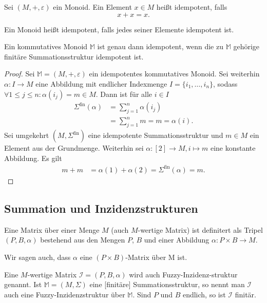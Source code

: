 \documentclass{article}
\begin{document}
\begin{definition}
  Sei $(M, +, \varepsilon)$ ein Monoid. 
  Ein Element $x \in M$ heißt idempotent, falls
  \begin{equation*}
    x + x = x.
  \end{equation*}
  
  Ein Monoid heißt idempotent, falls jedes seiner Elemente idempotent ist.
\end{definition}

\begin{theorem}\label{Theorem_IdempotentSumMonoid}
  Ein kommutatives Monoid $\mathbb{M}$ ist genau dann idempotent, 
  wenn die zu $\mathbb{M}$ gehörige finitäre Summationsstruktur idempotent ist.
\end{theorem}
\begin{proof}
  Sei $\mathbb{M} = (M, +, \varepsilon)$ ein idempotentes kommutatives Monoid.
  Sei weiterhin $\alpha \colon I \to M$ eine Abbildung mit endlicher Indexmenge $I = \{i_1, \dots, i_n\}$,
  sodass $\forall 1 \leq j \leq n \colon \alpha(i_j) = m \in M$.
  Dann ist für alle $i \in I$
  \begin{align*}
    \Sigma^\text{fin}(\alpha) &= \sum_{j = 1}^n\alpha(i_j) \\
    &= \sum_{j = 1}^n m = m = \alpha(i).
  \end{align*}
  Sei umgekehrt $(M, \Sigma^\text{fin})$ eine idempotente Summationsstruktur und $m \in M$ ein Element aus der Grundmenge.
  Weiterhin sei $\alpha \colon [2] \to M, i \mapsto m$ eine konstante Abbildung.
  Es gilt
  \begin{align*}
    m + m &= \alpha(1) + \alpha(2) = \Sigma^\text{fin}(\alpha) = m.
  \end{align*}
\end{proof}

\subsection{Summation und Inzidenzstrukturen}

\begin{definition}
  Eine Matrix über einer Menge $M$ (auch $M$-wertige Matrix) ist definitert als Tripel $(P, B, \alpha)$
  bestehend aus den Mengen $P$, $B$ und einer Abbildung $\alpha \colon P \times B \to M$.
  
  Wir sagen auch, dass $\alpha$ eine $(P \times B)$-Matrix über M ist. 
\end{definition}

\begin{definition}
  Eine $M$-wertige Matrix $\mathcal{I} = (P, B, \alpha)$ wird auch Fuzzy-Inzidenz-struktur genannt.
  Ist $\mathbb{M} = (M, \Sigma)$ eine [finitäre] Summationsstruktur, 
  so nennt man $\mathcal{I}$ auch eine Fuzzy-Inzidenzstruktur über $\mathbb{M}$.
  Sind $P$ und $B$ endlich, so ist $\mathcal{I}$ finitär.
\end{definition}
\end{document}

